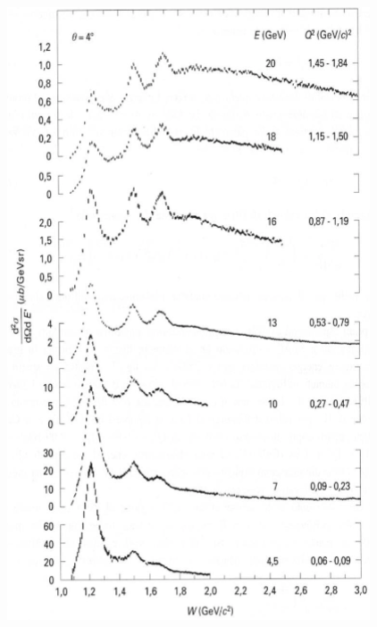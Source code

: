 \begin{minipage}[t]{0.48\textwidth}
    \begin{figure}[H]
        \centering
        \includegraphics[width=\textwidth]{immagini/fig_dis_sez_urto.png}
    \end{figure}
\end{minipage}
